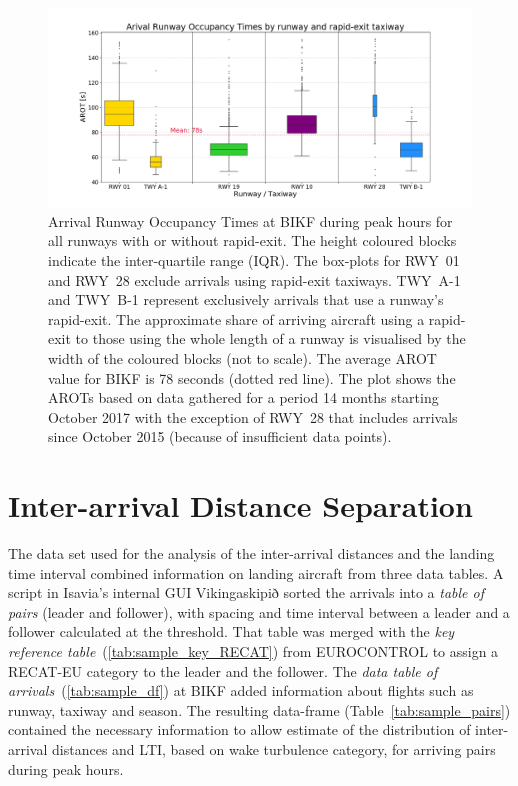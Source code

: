 \begin{figure}[h]
    \centering
    \includegraphics[width=1\textwidth]{graphics/fig_runway_AROTs_boxplot.png}
    \caption[AROTs box-plot per runway/taxiway]{Arrival Runway Occupancy Times at BIKF during peak hours for all runways with or without rapid-exit. The height coloured blocks indicate the inter-quartile range (IQR). The box-plots for RWY~01 and RWY~28 exclude arrivals using rapid-exit taxiways. TWY~A-1 and TWY~B-1 represent exclusively arrivals that use a runway's rapid-exit. The approximate share of arriving aircraft using a rapid-exit to those using the whole length of a runway is visualised by the width of the coloured blocks (not to scale). The average AROT value for BIKF is 78 seconds (dotted red line). The plot shows the AROTs based on data gathered for a period 14 months starting October 2017 with the exception of RWY~28 that includes arrivals since October 2015 (because of insufficient data points).}
    \label{fig:runway_AROTs_boxplot}
\end{figure}

\section{Inter-arrival Distance Separation}\label{sec:interarrival_dist_sep_RECAT}

The data set used for the analysis of the inter-arrival distances and the landing time interval combined information on landing aircraft from three data tables. A script in Isavia's internal GUI Vikingaskipið sorted the arrivals into a \textit{table of pairs} (leader and follower), with spacing and time interval between a leader and a follower calculated at the threshold. That table was merged with the \textit{key reference table}~(\ref{tab:sample_key_RECAT}) from EUROCONTROL to assign a RECAT-EU category to the leader and the follower. The \textit{data table of arrivals}~(\ref{tab:sample_df}) at BIKF added information about flights such as runway, taxiway and season. The resulting data-frame (Table~\ref{tab:sample_pairs}) contained the necessary information to allow estimate of the distribution of inter-arrival distances and LTI, based on wake turbulence category, for arriving pairs during peak hours.

